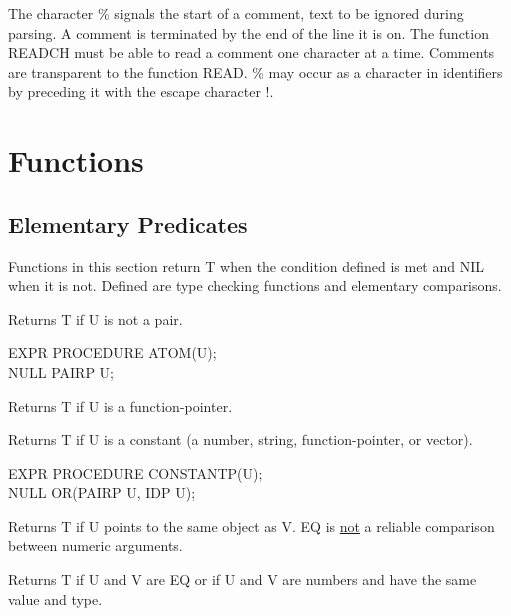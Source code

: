 \documentclass[11pt,letterpaper]{book}
\begin{document}
 \index{\%}
The character \% signals the start of a comment, text to be ignored
during parsing.  A comment is terminated by the end of the line it
 
is on.  The function READCH must be able to read a comment one
character at a time.  Comments are transparent to the function READ.
\% may occur as a character in identifiers by preceding it with the
escape character !.


\section{Functions}
\label{slfns}

\subsection{Elementary Predicates}
\label{elpreds}
 
Functions in this section return T when the condition defined is met
and NIL when it is not. Defined are type checking functions and
elementary comparisons.


{Returns T if U is not a pair.

{\tt \begin{tabbing} EXPR PROCEDURE ATOM(U); \\
\hspace*{1em} NULL PAIRP U;
\end{tabbing}}}


{Returns T if U is a function-pointer.}


{Returns T if U is a constant (a number, string, function-pointer, or
vector).

{\tt \begin{tabbing} EXPR PROCEDURE CONSTANTP(U); \\
\hspace*{1em} NULL OR(PAIRP U, IDP U);
\end{tabbing}}
}



{Returns T if U points to the same object as V. EQ is \underline{not}
a reliable comparison between numeric arguments. }


{Returns T if U and V are EQ or if U and V are numbers and have the
same value and type. }
\end{document}
